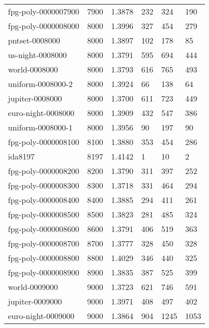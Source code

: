 \begin{longtable}{|lrrlll|}
fpg-poly-0000007900 & 7900 & \num{1.3878} & \num{232} & \num{324} & \num{190} \\
fpg-poly-0000008000 & 8000 & \num{1.3996} & \num{327} & \num{454} & \num{279} \\
pntset-0008000 & 8000 & \num{1.3897} & \num{102} & \num{178} & \num{85} \\
us-night-0008000 & 8000 & \num{1.3791} & \num{595} & \num{694} & \num{444} \\
world-0008000 & 8000 & \num{1.3793} & \num{616} & \num{765} & \num{493} \\
uniform-0008000-2 & 8000 & \num{1.3924} & \num{66} & \num{138} & \num{64} \\
jupiter-0008000 & 8000 & \num{1.3700} & \num{611} & \num{723} & \num{449} \\
euro-night-0008000 & 8000 & \num{1.3909} & \num{432} & \num{547} & \num{386} \\
uniform-0008000-1 & 8000 & \num{1.3956} & \num{90} & \num{197} & \num{90} \\
fpg-poly-0000008100 & 8100 & \num{1.3880} & \num{353} & \num{454} & \num{286} \\
ida8197 & 8197 & \num{1.4142} & \num{1} & \num{10} & \num{2} \\
fpg-poly-0000008200 & 8200 & \num{1.3790} & \num{311} & \num{397} & \num{252} \\
fpg-poly-0000008300 & 8300 & \num{1.3718} & \num{331} & \num{464} & \num{294} \\
fpg-poly-0000008400 & 8400 & \num{1.3885} & \num{294} & \num{411} & \num{261} \\
fpg-poly-0000008500 & 8500 & \num{1.3823} & \num{281} & \num{485} & \num{324} \\
fpg-poly-0000008600 & 8600 & \num{1.3791} & \num{406} & \num{519} & \num{363} \\
fpg-poly-0000008700 & 8700 & \num{1.3777} & \num{328} & \num{450} & \num{328} \\
fpg-poly-0000008800 & 8800 & \num{1.4029} & \num{346} & \num{440} & \num{325} \\
fpg-poly-0000008900 & 8900 & \num{1.3835} & \num{387} & \num{525} & \num{399} \\
world-0009000 & 9000 & \num{1.3723} & \num{621} & \num{746} & \num{591} \\
jupiter-0009000 & 9000 & \num{1.3971} & \num{408} & \num{497} & \num{402} \\
euro-night-0009000 & 9000 & \num{1.3864} & \num{904} & \num{1245} & \num{1053} \\

\end{longtable}
